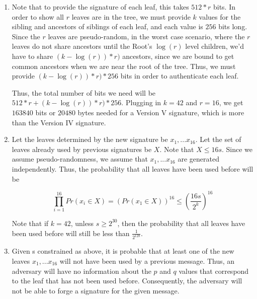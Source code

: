 \documentclass[11pt]{article}
\begin{document}
\begin{enumerate}[label=(\alph*)]
\item Note that to provide the signature of each leaf, this takes $512*r$ bits. In order to show all $r$ leaves are in the tree, we must provide $k$ values for the sibling and ancestors of siblings of each leaf, and each value is $256$ bits long. Since the $r$ leaves are pseudo-random, in the worst case scenario, where the $r$ leaves do not share ancestors until the Root's $\log(r)$ level children, we'd have to share $(k-\log(r))*r)$ ancestors, since we are bound to get common ancestors when we are near the root of the tree. Thus, we must provide $(k-\log(r))*r)*256$ bits in order to authenticate each leaf. 

Thus, the total number of bits we need will be $512*r + (k-\log(r))*r)*256$. Plugging in $k = 42$ and $r = 16$, we get $163840$ bits or $20480$ bytes needed for a Version V signature, which is more than the Version IV signature.


\item Let the leaves determined by the new signature be $x_1, ... x_{16}$. Let the set of leaves already used by previous signatures be $X$. Note that $X \le 16s$. Since we assume pseudo-randomness, we assume that $x_1, ... x_{16}$ are generated independently. Thus, the probability that all leaves have been used before will be 

$$\prod_{i = 1}^{16}Pr(x_i \in X) = (Pr(x_1 \in X))^{16} \le (\frac{16s}{2^k})^{16}$$

Note that if $k = 42$, unless $s \ge 2^{30}$, then the probability that all leaves have been used before will still be less than $\frac{1}{2^{128}}$. \\

\item Given s constrained as above, it is probable that at least one of the new leaves $x_1, ... x_{16}$ will not have been used by a previous message. Thus, an adversary will have no information about the $p$ and $q$ values that correspond to the leaf that has not been used before. Consequently, the adversary will not be able to forge a signature for the given message. \\

\end{enumerate}
\end{document}
